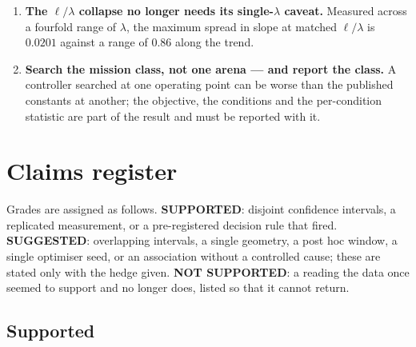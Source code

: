 \documentclass[11pt,a4paper]{article}
\begin{document}
\begin{enumerate}
\item \textbf{The $\ell/\lambda$ collapse no longer needs its single-$\lambda$
caveat.} Measured across a fourfold range of $\lambda$, the maximum spread in
slope at matched $\ell/\lambda$ is $0.0201$ against a range of $0.86$ along the
trend.

\item \textbf{Search the mission class, not one arena --- and report the class.}
A controller searched at one operating point can be worse than the published
constants at another; the objective, the conditions and the per-condition
statistic are part of the result and must be reported with it.
\end{enumerate}

\clearpage

\section{Claims register}
\label{app:claims}

Grades are assigned as follows. \textbf{SUPPORTED}: disjoint confidence
intervals, a replicated measurement, or a pre-registered decision rule that
fired. \textbf{SUGGESTED}: overlapping intervals, a single geometry, a post hoc
window, a single optimiser seed, or an association without a controlled cause;
these are stated only with the hedge given. \textbf{NOT SUPPORTED}: a reading
the data once seemed to support and no longer does, listed so that it cannot
return.

\subsection*{Supported}
\end{document}
